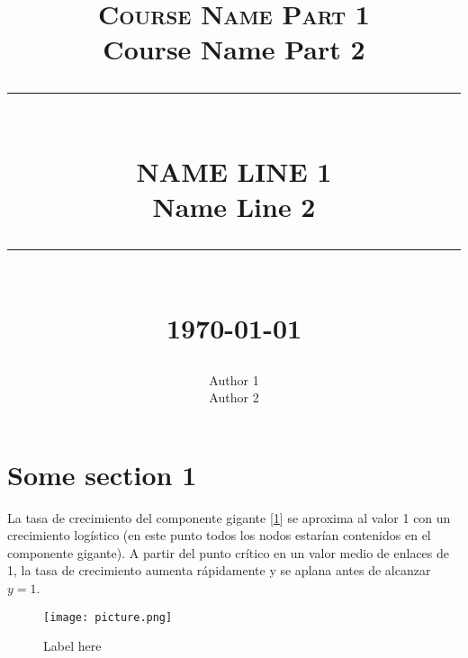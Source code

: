 \documentclass[12pt]{report}
\newcommand{\HRule}[1]{\rule{\linewidth}{#1}}
\newcommand\pef[1]{[\ref{#1}]}
\begin{document}
\title{ \normalsize \textsc{Course Name Part 1} \\ Course Name Part 2
		\\ [2.0cm]
		\HRule{0.5pt} \\
		\LARGE \textbf{\uppercase{Name Line 1} \\ Name Line 2}
		\HRule{2pt} \\ [0.5cm]
		\normalsize \today \vspace*{5\baselineskip}}

\date{}

\author{
		Author 1 \\
        Author 2
  }

\maketitle

\tableofcontents

\pagestyle{fancy}
\fancyhf{}
\newpage
{}
\rhead{ \today}

\section{Some section 1}

La tasa de crecimiento del componente gigante \pef{fig:tasadecreci} se aproxima al valor 1 con un crecimiento logístico (en este punto todos los nodos estarían contenidos en el componente gigante). A partir del punto crítico en un valor medio de enlaces de 1, la tasa de crecimiento aumenta rápidamente y se aplana antes de alcanzar $y=1$.

\begin{figure}[H]
    \centering
    \texttt{[image: picture.png]}
    \caption{Label here}
    \label{fig:tasadecreci}
\end{figure}
\end{document}
